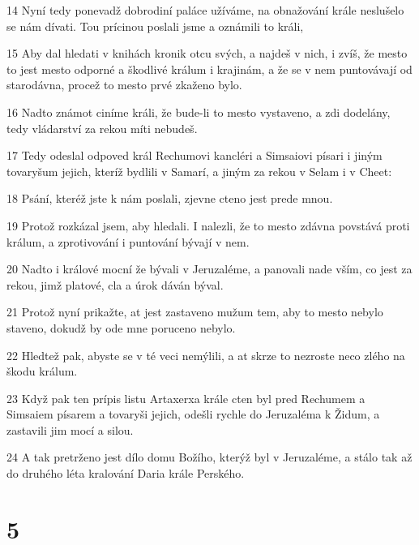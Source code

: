 \par 14 Nyní tedy ponevadž dobrodiní paláce užíváme, na obnažování krále neslušelo se nám dívati. Tou prícinou poslali jsme a oznámili to králi,
\par 15 Aby dal hledati v knihách kronik otcu svých, a najdeš v nich, i zvíš, že mesto to jest mesto odporné a škodlivé králum i krajinám, a že se v nem puntovávají od starodávna, procež to mesto prvé zkaženo bylo.
\par 16 Nadto známot ciníme králi, že bude-li to mesto vystaveno, a zdi dodelány, tedy vládarství za rekou míti nebudeš.
\par 17 Tedy odeslal odpoved král Rechumovi kancléri a Simsaiovi písari i jiným tovaryšum jejich, kteríž bydlili v Samarí, a jiným za rekou v Selam i v Cheet:
\par 18 Psání, kteréž jste k nám poslali, zjevne cteno jest prede mnou.
\par 19 Protož rozkázal jsem, aby hledali. I nalezli, že to mesto zdávna povstává proti králum, a zprotivování i puntování bývají v nem.
\par 20 Nadto i králové mocní že bývali v Jeruzaléme, a panovali nade vším, co jest za rekou, jimž platové, cla a úrok dáván býval.
\par 21 Protož nyní prikažte, at jest zastaveno mužum tem, aby to mesto nebylo staveno, dokudž by ode mne poruceno nebylo.
\par 22 Hledtež pak, abyste se v té veci nemýlili, a at skrze to nezroste neco zlého na škodu králum.
\par 23 Když pak ten prípis listu Artaxerxa krále cten byl pred Rechumem a Simsaiem písarem a tovaryši jejich, odešli rychle do Jeruzaléma k Židum, a zastavili jim mocí a silou.
\par 24 A tak pretrženo jest dílo domu Božího, kterýž byl v Jeruzaléme, a stálo tak až do druhého léta kralování Daria krále Perského.

\chapter{5}

